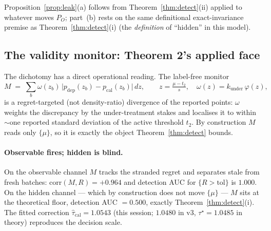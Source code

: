 \noindent Proposition~\ref{prop:leak}(a) follows from Theorem~\ref{thm:detect}(ii) applied to whatever
moves $P_O$; part~(b) rests on the same definitional exact-invariance premise as
Theorem~\ref{thm:detect}(i) (the \emph{definition} of ``hidden'' in this model).

\subsection{The validity monitor: Theorem 2's applied face}
\label{sec:monitor}

The dichotomy has a direct operational reading. The label-free monitor
\begin{equation}
M \;=\; \sum_b \omega(z_b)\,\bigl|p_{\mathrm{dep}}(z_b)-p_{\mathrm{cal}}(z_b)\bigr|\,dz,
\qquad z=\tfrac{\mu-t_2}{s},\quad \omega(z)=k_{\mathrm{under}}\,\varphi(z),
\label{eq:monitor}
\end{equation}
is a regret-targeted (not density-ratio) divergence of the reported points: $\omega$ weights the
discrepancy by the under-treatment stakes and localises it to within $\sim$one reported standard
deviation of the active threshold $t_2$. By construction $M$ reads only $\{\mu\}$, so it is exactly the
object Theorem~\ref{thm:detect} bounds.

\paragraph{Observable fires; hidden is blind.}
On the observable channel $M$ tracks the stranded regret and separates stale from fresh batches:
$\mathrm{corr}(M,R)=+0.964$ and detection AUC for $\{R>\text{tol}\}$ is $1.000$.
On the hidden channel --- which by construction does not move $\{\mu\}$ --- $M$ sits at the theoretical
floor, detection AUC $=0.500$,
exactly Theorem~\ref{thm:detect}(i). The fitted correction $\hat\tau_{\mathrm{cal}}=1.0543$ (this session;
$1.0480$ in v3, $\tau^\star=1.0485$ in theory) reproduces the decision scale.


